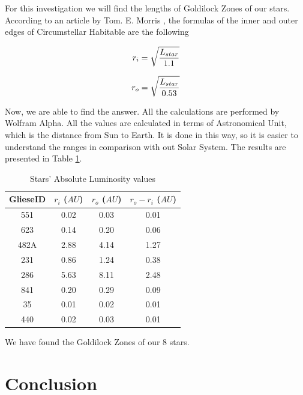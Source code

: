 \documentclass{article}
\begin{document}
For this investigation we will find the lengths of Goldilock Zones of our stars. According to an article by Tom. E. Morris \cite{habz}, the formulas of the inner and outer edges of Circumstellar Habitable are the following

\begin{equation}
  r_i = \sqrt{\frac{L_{star}}{1.1}}\\
  \end{equation}

\begin{equation}
  r_o = \sqrt{\frac{L_{star}}{0.53}}\\
  \end{equation}

Now, we are able to find the answer. All the calculations are performed by Wolfram Alpha. All the values are calculated in terms of Astronomical Unit, which is the distance from Sun to Earth. It is done in this way, so it is easier to understand the ranges in comparison with out Solar System. The results are presented in Table \ref{chz}.


\begin{table}[h]
    \begin{center}
      \caption{Stars' Absolute Luminosity values}
      \begin{tabular}{c | c | c | c}
        \textbf{GlieseID} & \textbf{$r_i$} \textbf{($AU$)} & \textbf{$r_o$} \textbf{($AU$)} & \textbf{$r_o - r_i$} \textbf{($AU$)}\\
        \hline
        551  & 0.02 & 0.03 & 0.01\\
        623  & 0.14 & 0.20 & 0.06\\
        482A & 2.88 & 4.14 & 1.27\\
        231  & 0.86 & 1.24 & 0.38\\
        286  & 5.63 & 8.11 & 2.48\\
        841  & 0.20 & 0.29 & 0.09\\
        35   & 0.01 & 0.02 & 0.01\\
        440  & 0.02 & 0.03 & 0.01\\
      \end{tabular}
      \label{chz}
    \end{center}
  \end{table}

We have found the Goldilock Zones of our 8 stars.

\section{Conclusion}
\end{document}
